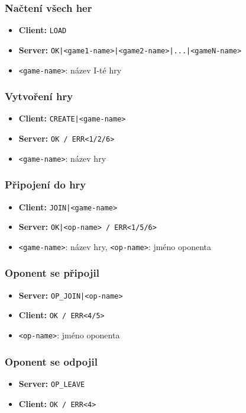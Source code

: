\documentclass[11pt,a4paper]{article}
\begin{document}
\subsubsection*{Načtení všech her}
\begin{itemize}
	\item \textbf{Client:} \texttt{LOAD}
	\item \textbf{Server:} \texttt{OK|<game1-name>|<game2-name>|...|<gameN-name>}
	\item \texttt{<game-name>}: název I-té hry
\end{itemize}

\subsubsection*{Vytvoření hry}
\begin{itemize}
	\item \textbf{Client:} \texttt{CREATE|<game-name>}
	\item \textbf{Server:} \texttt{OK / ERR<1/2/6>}
	\item \texttt{<game-name>}: název hry
\end{itemize}

\subsubsection*{Připojení do hry}
\begin{itemize}
	\item \textbf{Client:} \texttt{JOIN|<game-name>}
	\item \textbf{Server:} \texttt{OK|<op-name> / ERR<1/5/6>}
	\item \texttt{<game-name>}: název hry, \texttt{<op-name>}: jméno oponenta
\end{itemize}

\subsubsection*{Oponent se připojil}
\begin{itemize}
	\item \textbf{Server:} \texttt{OP\_JOIN|<op-name>}
	\item \textbf{Client:} \texttt{OK / ERR<4/5>}
	\item \texttt{<op-name>}: jméno oponenta
\end{itemize}

\subsubsection*{Oponent se odpojil}
\begin{itemize}
	\item \textbf{Server:} \texttt{OP\_LEAVE}
	\item \textbf{Client:} \texttt{OK / ERR<4>}
\end{itemize}
\end{document}
